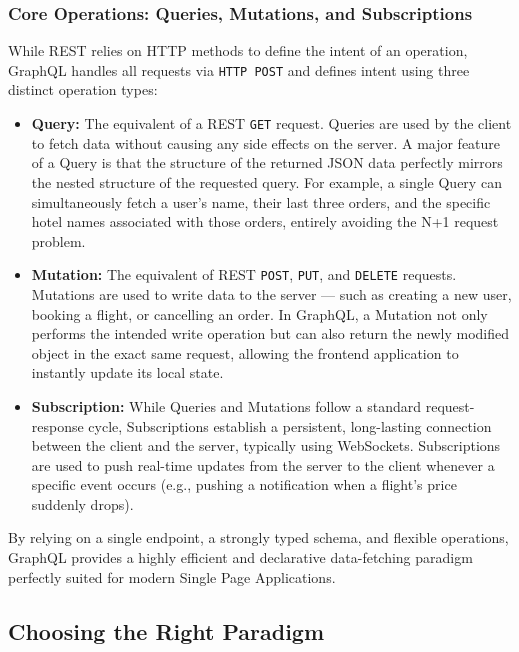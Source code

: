 \subsubsection{Core Operations: Queries, Mutations, and Subscriptions}

While REST relies on HTTP methods to define the intent of an operation, GraphQL handles all requests via \texttt{HTTP POST} and defines intent using three distinct operation types:

\begin{itemize}
    \item \textbf{Query:} The equivalent of a REST \texttt{GET} request. Queries are used by the client to fetch data without causing any side effects on the server. A major feature of a Query is that the structure of the returned JSON data perfectly mirrors the nested structure of the requested query. For example, a single Query can simultaneously fetch a user's name, their last three orders, and the specific hotel names associated with those orders, entirely avoiding the N+1 request problem.

    \item \textbf{Mutation:} The equivalent of REST \texttt{POST}, \texttt{PUT}, and \texttt{DELETE} requests. Mutations are used to write data to the server — such as creating a new user, booking a flight, or cancelling an order. In GraphQL, a Mutation not only performs the intended write operation but can also return the newly modified object in the exact same request, allowing the frontend application to instantly update its local state.
    
    \item \textbf{Subscription:} While Queries and Mutations follow a standard request-response cycle, Subscriptions establish a persistent, long-lasting connection between the client and the server, typically using WebSockets. Subscriptions are used to push real-time updates from the server to the client whenever a specific event occurs (e.g., pushing a notification when a flight's price suddenly drops).
\end{itemize}

By relying on a single endpoint, a strongly typed schema, and flexible operations, GraphQL provides a highly efficient and declarative data-fetching paradigm perfectly suited for modern Single Page Applications.

\subsection{Choosing the Right Paradigm}

